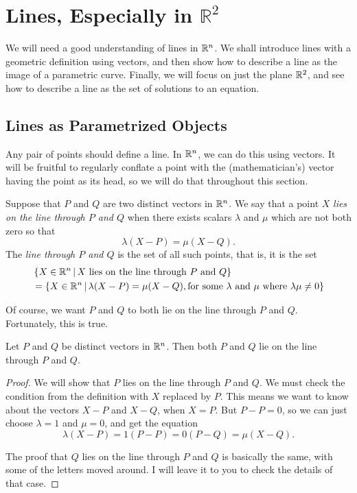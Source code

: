 \documentclass[elementsmain.tex]{subfiles}
\begin{document}
\section{Lines, Especially in $\mathbb{R}^2$}

We will need a good understanding of lines in $\R^n$. We shall introduce lines
with a geometric definition using vectors, and then show how to describe a line as the 
image of a parametric curve. Finally, we will focus on just the plane $\mathbb{R}^2$, and see
how to describe a line as the set of solutions to an equation.

\subsection*{Lines as Parametrized Objects}

Any pair of points should define a line. In $\R^n$, we can do this using vectors.
It will be fruitful to regularly conflate a point with the (mathematician's) vector having the point as its head, so we will do that throughout this section.

\begin{definition}[Lines in $\R^n$]
Suppose that $P$ and $Q$ are two distinct vectors in $\R^n$. We say that a point $X$ \emph{lies on the line through $P$ and $Q$} when there exists scalars $\lambda$ and $\mu$ which are not both zero so that
\[
\lambda (X-P) = \mu (X-Q).
\]
The \emph{line through $P$ and $Q$} is the set of all such points, that is, it is the set
\[
\begin{split}
&\left\{ X  \in \mathbb{R}^n \,\middle|\, \text{$X$ lies on the line through $P$ and $Q$}\right\} \\
& = \left\{ X\in\mathbb{R}^n \,\middle|\, \lambda(X-P) = \mu(X-Q), \text{for some $\lambda$ and $\mu$ where $\lambda\mu\neq0$} \right\}
\end{split}
\]
\end{definition}

Of course, we want $P$ and $Q$ to both lie on the line through $P$ and $Q$. Fortunately, this is true.

\begin{theorem}
Let $P$ and $Q$ be distinct vectors in $\R^n$. Then both $P$ and $Q$ lie on the line through $P$ and $Q$.
\end{theorem}

\begin{proof}
We will show that $P$ lies on the line through $P$ and $Q$. 
We must check the condition from the definition with $X$ replaced by $P$. This means we want to know about the vectors $X-P$ and $X-Q$, when $X=P$. But $P-P=0$, so we can just choose $\lambda = 1$ and $\mu=0$, and get the equation 
\[
\lambda (X-P) = 1 (P - P) = 0 (P - Q) = \mu (X-Q) .
\]

The proof that $Q$ lies on the line through $P$ and $Q$ is basically the same, with some of the letters moved around. I will leave it to you to check the details of that case.
\end{proof}
\end{document}
